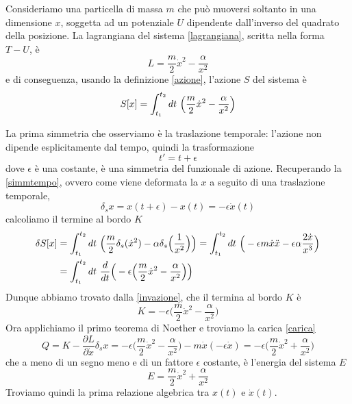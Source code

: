 \begin{example} 
    Consideriamo una particella di massa $m$ che può muoversi soltanto in una dimensione $x$, soggetta ad un potenziale $U$ dipendente dall'inverso del quadrato della posizione. La lagrangiana del sistema \eqref{lagrangiana}, scritta nella forma $T - U$, è
\begin{equation} \label{lag1}
    L = \frac{m}{2} \dot x^2 - \frac{\alpha}{x^2} 
\end{equation}
    e di conseguenza, usando la definizione \eqref{azione}, l'azione $S$ del sistema è
\begin{equation}
    S[x] = \int_{t_1}^{t_2}dt~ \Big( \frac{m}{2} \dot x^2 - \frac{\alpha}{x^2} \Big)
\end{equation}

    La prima simmetria che osserviamo è la traslazione temporale: l'azione non dipende esplicitamente dal tempo, quindi la trasformazione
\begin{equation*}
    t' = t + \epsilon
\end{equation*}
    dove $\epsilon$ è una costante, è una simmetria del funzionale di azione. Recuperando la \eqref{simmtempo}, ovvero come viene deformata la $x$ a seguito di una traslazione temporale,
\begin{equation*}
    \delta_s x = x(t + \epsilon) - x(t) = - \epsilon \dot x(t)
\end{equation*}
    calcoliamo il termine al bordo $K$ 
\begin{equation*}
\begin{aligned}
    \delta S[x] & = \int_{t_1}^{t_2}dt~ \Big( \frac{m}{2} \delta_s (\dot x^2) - \alpha \delta_s \Big (\frac{1}{x^2} \Big) \Big) = \int_{t_1}^{t_2}dt~ \Big( - \epsilon m \dot x \ddot x - \epsilon \alpha \frac{2 \dot x}{x^3} \Big) \\ & = \int_{t_1}^{t_2}dt~ \frac{d}{dt} \Big( -\epsilon \Big( \frac{m}{2} \dot x^2 - \frac{\alpha}{x^2} \Big) \Big)
\end{aligned}
\end{equation*}
    Dunque abbiamo trovato dalla \eqref{invazione}, che il termina al bordo $K$ è
\begin{equation*}
    K = - \epsilon \Big (\frac{m}{2} \dot x^2 - \frac{\alpha}{x^2} \Big)
\end{equation*}
    Ora applichiamo il primo teorema di Noether e troviamo la carica \eqref{carica} 
\begin{equation*}
    Q = K - \frac{\partial L}{\partial \dot x} \delta_s x = - \epsilon \Big (\frac{m}{2} \dot x^2 - \frac{\alpha}{x^2} \Big) - m \dot x (-\epsilon \dot x) = - \epsilon (\frac{m}{2} \dot x^2 + \frac{\alpha}{x^2} \Big)
\end{equation*}
    che a meno di un segno meno e di un fattore $\epsilon$ costante, è l'energia del sistema $E$
\begin{equation}\label{energia1}
    E = \frac{m}{2} \dot x^2 + \frac{\alpha}{x^2}
\end{equation}
    Troviamo quindi la prima relazione algebrica tra $x(t)$ e $\dot x(t)$. 


\end{example}
